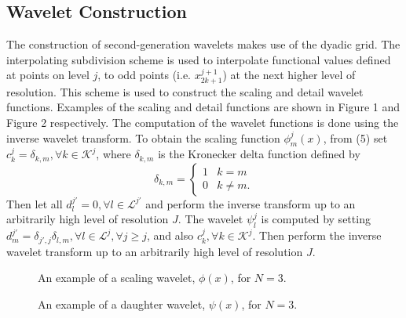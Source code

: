 \documentclass[11pt]{article}
\begin{document}
\subsection{Wavelet Construction}
The construction of second-generation wavelets makes use of the dyadic grid. The interpolating subdivision scheme is 
used to interpolate functional values defined at points on level $j$, to odd points (i.e. $x_{2k+1}^{j+1}$) at the next
higher level of resolution. This scheme is used to construct the scaling and detail wavelet functions. Examples of the scaling and detail functions are shown in Figure 1 and Figure 2 respectively.
The computation of the wavelet functions is done using the inverse wavelet transform. To obtain the scaling function $\phi_{m}^{j}(x)$, from (5) set $c_{k}^{j}=\delta_{k,m}, \forall k \in \mathcal{K}^j$, where $\delta_{k,m}$ is the Kronecker delta function defined by
\[ \delta_{k,m} = \begin{cases} 
      1 & k=m \\
      0 & k \neq m.
   \end{cases}
\]
Then let all $d_{l}^{j'}=0, \forall l \in \mathcal{L}^{j'}$ and perform the inverse transform up to an arbitrarily high level of resolution $J$. The wavelet $\psi_{l}^{j}$ is computed by setting $d_{m}^{j'} = \delta_{j',j} \delta_{l,m}, \forall l \in \mathcal{L}^{j}, \forall j \geq j$, and also $c_{k}^{j}, \forall k \in \mathcal{K}^j$. Then perform the inverse wavelet transform up to an arbitrarily high level of resolution $J$.
\begin{figure}
	\center
	
	\caption{An example of a scaling wavelet, $\phi(x)$, for $N=3$.}
\end{figure}
\begin{figure}
	\center
	
	\caption{An example of a daughter wavelet, $\psi(x)$, for $N=3$.}
\end{figure}
\end{document}

